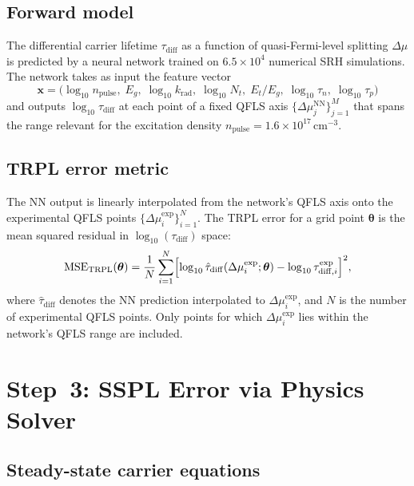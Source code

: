 \documentclass[a4paper,11pt]{article}
\newcommand{\btheta}{\boldsymbol{\theta}}
\newcommand{\MSE}{\mathrm{MSE}}
\newcommand{\TRPL}{\mathrm{TRPL}}
\newcommand{\NN}{\mathrm{NN}}
\newcommand{\logten}{\log_{10}}
\begin{document}
\subsection{Forward model}

The differential carrier lifetime $\tau_\mathrm{diff}$ as a function of
quasi-Fermi-level splitting $\Delta\mu$ is predicted by a neural network
trained on $6.5\times10^4$ numerical SRH simulations. The network takes
as input the feature vector
\begin{equation}
  \mathbf{x} = \bigl(
    \logten n_\mathrm{pulse},\;
    E_g,\;
    \logten k_\mathrm{rad},\;
    \logten N_t,\;
    E_t / E_g,\;
    \logten \tau_n,\;
    \logten \tau_p
  \bigr)
\end{equation}
and outputs $\logten \tau_\mathrm{diff}$ at each point of a fixed QFLS axis
$\{\Delta\mu_j^{\NN}\}_{j=1}^{M}$ that spans the range relevant for the
excitation density $n_\mathrm{pulse} = 1.6\times10^{17}$\,cm$^{-3}$.

\subsection{TRPL error metric}

The NN output is linearly interpolated from the network's QFLS axis onto the
experimental QFLS points $\{\Delta\mu_i^\mathrm{exp}\}_{i=1}^{N}$.
The TRPL error for a grid point $\btheta$ is the mean squared residual in
$\logten(\tau_\mathrm{diff})$ space:
\begin{equation}
  \MSE_\TRPL(\btheta)
  = \frac{1}{N}\sum_{i=1}^{N}
    \Bigl[\logten\hat{\tau}_\mathrm{diff}(\Delta\mu_i^\mathrm{exp};\btheta)
          - \logten\tau_{\mathrm{diff},i}^\mathrm{exp}\Bigr]^2,
  \label{eq:mse_trpl}
\end{equation}
where $\hat{\tau}_\mathrm{diff}$ denotes the NN prediction interpolated to
$\Delta\mu_i^\mathrm{exp}$, and $N$ is the number of experimental QFLS points.
Only points for which $\Delta\mu_i^\mathrm{exp}$ lies within the network's QFLS
range are included.

\section{Step~3: SSPL Error via Physics Solver}

\subsection{Steady-state carrier equations}
\end{document}
